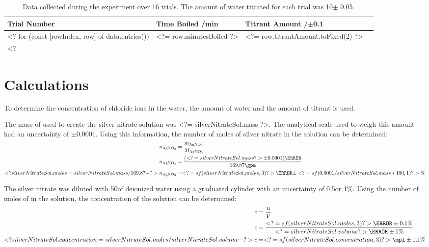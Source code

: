 \documentclass[11pt]{article}
\begin{document}
\begin{table}[H]
	\caption{Data collected during the experiment over 16 trials. The amount of water titrated for each trial was 10\ml $\pm$ 0.05\ml .}
	\def\arraystretch{1.5}
	\begin{tabularx}{\linewidth}{|
			>{\RaggedRight}X|
			>{\RaggedRight}X|
			>{\RaggedRight}X|
			>{\RaggedRight}X|
		}
		\hline
		\textbf{Trial Number}              &
		\textbf{Time Boiled} /\si{\minute} &
		\textbf{Titrant Amount} /$\pm$0.1\ml
		\\\hline
		<? for (const [rowIndex, row] of data.entries()) { ?>
			Trial <?= rowIndex + 1 ?>
			& <?= row.minutesBoiled ?>
			& <?= row.titrantAmount.toFixed(2) ?>
			\\\hline
		<? } ?>
	\end{tabularx}
\end{table}

\section{Calculations}

To determine the concentration of chloride ions in the water, the amount of water and the amount of titrant is used.

The mass of  used to create the silver nitrate solution was <?= silverNitrateSol.mass ?>\g. The analytical scale used to weigh this amount had an uncertainty of $\pm$0.0001\g. Using this information, the number of moles of silver nitrate in the solution can be determined:
%
\begin{align*}
	n_{\ce{AgNO3}} & = \frac{m_{\ce{AgNO3}}}{M_{\ce{AgNO3}}}
	\\
	n_{\ce{AgNO3}} & = \frac{(<?= silverNitrateSol.mass ?> \pm 0.0001)\g}{169.87\gpm}
	\\
	<? silverNitrateSol.moles = silverNitrateSol.mass / 169.87 -?>
	n_{\ce{AgNO3}} & = <?= sf(silverNitrateSol.moles, 3) ?>\mol \pm <?= sf(0.0001 / silverNitrateSol.mass * 100, 1) ?>\%
\end{align*}

The silver nitrate was diluted with 50\ml of deionized water using a graduated cylinder with an uncertainty of 0.5\ml or 1\%. Using the number of moles of  in the solution, the concentration of the solution can be determined:
%
\begin{align*}
	c & = \frac{n}{V}
	\\
	c & = \frac{<?= sf(silverNitrateSol.moles, 3) ?>\mol \pm 0.1\%}{<?= silverNitrateSol.volume ?>\litre \pm 1\%}
	\\
	<? silverNitrateSol.concentration = silverNitrateSol.moles / silverNitrateSol.volume -?>
	c & = <?= sf(silverNitrateSol.concentration, 3) ?>\mpl \pm 1.1\%
\end{align*}
\end{document}
